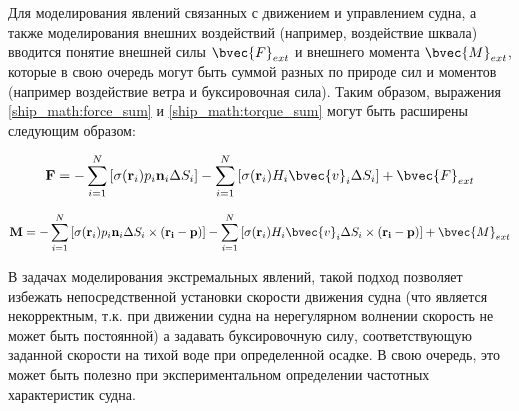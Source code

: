 Для моделирования явлений связанных с движением и управлением судна, а также моделирования внешних воздействий (например, воздействие шквала) вводится понятие внешней силы $\bvec{F}_{ext}$ и внешнего момента $\bvec{M}_{ext}$, которые в свою очередь могут быть суммой разных по природе сил и моментов (например воздействие ветра и буксировочная сила). Таким образом, выражения \eqref{ship_math:force_sum} и  \eqref{ship_math:torque_sum} могут быть расширены следующим образом:


\begin{equation}
	\mathbf{F} = 
		-\sum_{i=1}^{N} \left[
			\sigma (\mathbf{r}_i) p_i \mathbf{n}_i \Delta S_i
		\right]
		-\sum_{i=1}^{N} \left[
			\sigma (\mathbf{r}_i) H_i \bvec{v}_i \Delta S_i
		\right] 
		+ \bvec{F}_{ext}
\end{equation}

\begin{equation}
	\mathbf{M} = 
		-\sum_{i=1}^{N} \left[
			\sigma (\mathbf{r}_i) p_i \mathbf{n}_i \Delta S_i \times (\mathbf{r_i} - \mathbf{p})
		\right]
		-\sum_{i=1}^{N} \left[
			\sigma (\mathbf{r}_i) H_i \bvec{v}_i \Delta S_i \times (\mathbf{r_i} - \mathbf{p})
		\right]
		+ \bvec{M}_{ext}
\end{equation}

В задачах моделирования экстремальных явлений, такой подход позволяет избежать непосредственной установки скорости движения судна (что является некорректным, т.к. при движении судна на нерегулярном волнении скорость не может быть постоянной) а задавать буксировочную силу, соответствующую заданной скорости на тихой воде при определенной осадке. В свою очередь, это может быть полезно при экспериментальном определении частотных характеристик судна.